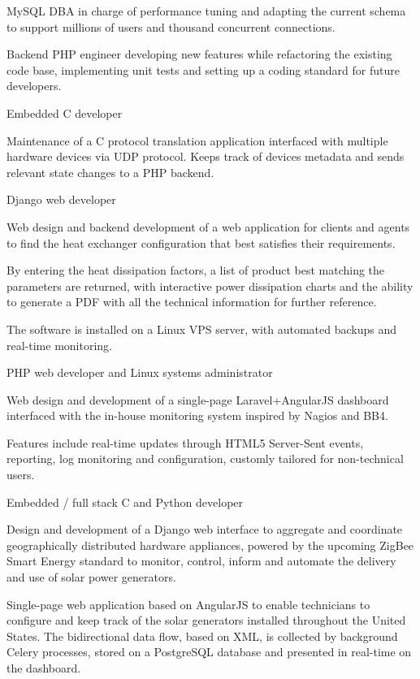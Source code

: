 \documentclass{resume}
\begin{document}
MySQL DBA in charge of performance tuning and adapting the current schema to support millions of users and thousand concurrent connections.

Backend PHP engineer developing new features while refactoring the existing code base, implementing unit tests and setting up a coding standard for future developers.

Embedded C developer

Maintenance of a C protocol translation application interfaced with multiple hardware devices via UDP protocol. Keeps track of devices metadata and sends relevant state changes to a PHP backend.

Django web developer

Web design and backend development of a web application for clients and agents to find the heat exchanger configuration that best satisfies their requirements.

By entering the heat dissipation factors, a list of product best matching the parameters are returned, with interactive power dissipation charts and the ability to generate a PDF with all the technical information for further reference.

The software is installed on a Linux VPS server, with automated backups and real-time monitoring.

PHP web developer and Linux systems administrator

Web design and development of a single-page Laravel+AngularJS dashboard interfaced with the in-house monitoring system inspired by Nagios and BB4.

Features include real-time updates through HTML5 Server-Sent events, reporting, log monitoring and configuration, customly tailored for non-technical users.

Embedded / full stack C and Python developer

Design and development of a Django web interface to aggregate and coordinate geographically distributed hardware appliances, powered by the upcoming ZigBee Smart Energy standard to monitor, control, inform and automate the delivery and use of solar power generators.

Single-page web application based on AngularJS to enable technicians to configure and keep track of the solar generators installed throughout the United States. The bidirectional data flow, based on XML, is collected by background Celery processes, stored on a PostgreSQL database and presented in real-time on the dashboard.
\end{document}
